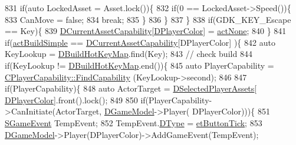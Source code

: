 \begin{DoxyCode}
831                 \textcolor{keywordflow}{if}(\textcolor{keyword}{auto} LockedAsset = Asset.lock())\{
832                     \textcolor{keywordflow}{if}(0 == LockedAsset->Speed())\{
833                         CanMove = \textcolor{keyword}{false};
834                         \textcolor{keywordflow}{break};
835                     \}
836                 \}
837             \}
838             \textcolor{keywordflow}{if}(GDK\_KEY\_Escape == Key)\{
839                 \hyperlink{classCApplicationData_a7e0dbfdc54f73dfa9838ae81b8017e2d}{DCurrentAssetCapability}[\hyperlink{classCApplicationData_a53550939b20cba70570f113e4d1c5d02}{DPlayerColor}] = 
      \hyperlink{GameDataTypes_8h_a35b98ce26aca678b03c6f9f76e4778ceaa8df154ad276f6f62054e9b5b0696f92}{actNone};   
840             \}
841             \textcolor{keywordflow}{if}(\hyperlink{GameDataTypes_8h_a35b98ce26aca678b03c6f9f76e4778ceacab8a5395c24e2bf1c9778a0066a3237}{actBuildSimple} == \hyperlink{classCApplicationData_a7e0dbfdc54f73dfa9838ae81b8017e2d}{DCurrentAssetCapability}[DPlayerColor]
      )\{
842                 \textcolor{keyword}{auto} KeyLookup = \hyperlink{classCApplicationData_accd0e5b0bf28b34b8cce8148eb13de31}{DBuildHotKeyMap}.find(Key);
843                 \textcolor{comment}{// check build}
844                 \textcolor{keywordflow}{if}(KeyLookup != \hyperlink{classCApplicationData_accd0e5b0bf28b34b8cce8148eb13de31}{DBuildHotKeyMap}.end())\{
845                     \textcolor{keyword}{auto} PlayerCapability = \hyperlink{classCPlayerCapability_a881ba4b87385d7cfe5cb6ced2d26f226}{CPlayerCapability::FindCapability}
      (KeyLookup->second); 
846             
847                     \textcolor{keywordflow}{if}(PlayerCapability)\{
848                         \textcolor{keyword}{auto} ActorTarget = \hyperlink{classCApplicationData_a05c1087d5a5c4ddc14fcb37444f1642b}{DSelectedPlayerAssets}[
      \hyperlink{classCApplicationData_a53550939b20cba70570f113e4d1c5d02}{DPlayerColor}].front().lock();
849                         
850                         \textcolor{keywordflow}{if}(PlayerCapability->CanInitiate(ActorTarget, \hyperlink{classCApplicationData_a32b50c7c1cbac3cfd67c7f775b1d6fee}{DGameModel}->Player(
      DPlayerColor)))\{
851                             \hyperlink{structSGameEvent}{SGameEvent} TempEvent;
852                             TempEvent.\hyperlink{structSGameEvent_afa10562e243f4ac2b473b655cc58fee7}{DType} = \hyperlink{GameModel_8h_abfcf510bafec7c6429906a6ecaac656dafe7284f9af34794514e5dbfe974e3296}{etButtonTick};
853                             \hyperlink{classCApplicationData_a32b50c7c1cbac3cfd67c7f775b1d6fee}{DGameModel}->Player(DPlayerColor)->AddGameEvent(TempEvent);

\end{DoxyCode}
